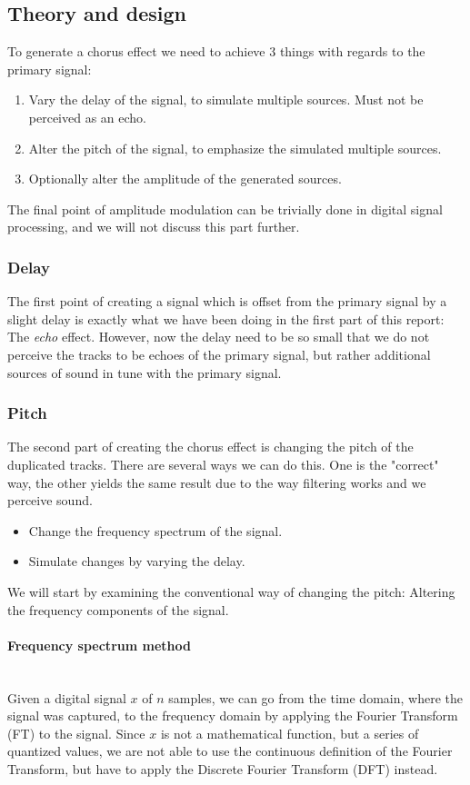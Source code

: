 
\subsection{Theory and design}
To generate a chorus effect we need to achieve 3 things with regards to the primary signal:
\begin{enumerate}
	\item Vary the delay of the signal, to simulate multiple sources. Must not be perceived as an echo.
	\item Alter the pitch of the signal, to emphasize the simulated multiple sources.
	\item Optionally alter the amplitude of the generated sources.
\end{enumerate}

The final point of amplitude modulation can be trivially done in digital signal processing, and we will not discuss this part further.

\subsubsection{Delay}
The first point of creating a signal which is offset from the primary signal by a slight delay is exactly what we have been doing in the first part of this report: The \emph{echo} effect. However, now the delay need to be so small that we do not perceive the tracks to be echoes of the primary signal, but rather additional sources of sound in tune with the primary signal.

\subsubsection{Pitch}
The second part of creating the chorus effect is changing the pitch of the duplicated tracks. There are several ways we can do this. One is the "correct" way, the other yields the same result due to the way filtering works and we perceive sound.
\begin{itemize}
	\item Change the frequency spectrum of the signal.
	\item Simulate changes by varying the delay.
\end{itemize}
We will start by examining the conventional way of changing the pitch: Altering the frequency components of the signal.

\paragraph{Frequency spectrum method}\mbox{}\\
Given a digital signal $x$ of $n$ samples, we can go from the time domain, where the signal was captured, to the frequency domain by applying the Fourier Transform (FT) to the signal. Since $x$ is not a mathematical function, but a series of quantized values, we are not able to use the continuous definition of the Fourier Transform, but have to apply the Discrete Fourier Transform (DFT) instead.

